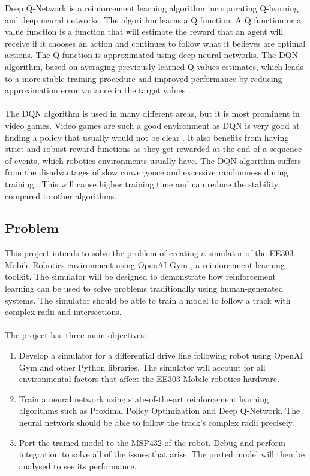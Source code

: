 \documentclass[a4paper,12pt]{article}
\begin{document}
Deep Q-Network is a reinforcement learning algorithm incorporating Q-learning and deep neural networks. The algorithm learns a Q function. A Q function or a value function is a function that will estimate the reward that an agent will receive if it chooses an action and continues to follow what it believes are optimal actions. The Q function is approximated using deep neural networks. The DQN algorithm, based on averaging previously learned Q-values estimates, which leads to a more stable training procedure and improved performance by reducing approximation error variance in the target values \cite{Anschel}.
\\\\
The DQN algorithm is used in many different areas, but it is most prominent in video games. Video games are such a good environment as DQN is very good at finding a policy that usually would not be clear \cite{mnih2013playing}. It also benefits from having strict and robust reward functions as they get rewarded at the end of a sequence of events, which robotics environments usually have. The DQN algorithm suffers from the disadvantages of slow convergence and excessive randomness during training \cite{YangMulti}. This will cause higher training time and can reduce the stability compared to other algorithms. 
\subsection{Problem}

This project intends to solve the problem of creating a simulator of the EE303 Mobile Robotics environment using OpenAI Gym \cite{brockman2016openai}, a reinforcement learning toolkit. The simulator will be designed to demonstrate how reinforcement learning can be used to solve problems traditionally using human-generated systems. The simulator should be able to train a model to follow a track with complex radii and intersections.
\\\\
The project has three main objectives:

\begin{enumerate}
  \item Develop a simulator for a differential drive line following robot using OpenAI Gym and other Python libraries. The simulator will account for all environmental factors that affect the EE303 Mobile robotics hardware. 

  \item Train a neural network using state-of-the-art reinforcement learning algorithms such as Proximal Policy Optimization and Deep Q-Network. The neural network should be able to follow the track's complex radii precisely.
  \item Port the trained model to the MSP432 of the robot. Debug and perform integration to solve all of the issues that arise. The ported model will then be analysed to see its performance.

\end{enumerate}
\end{document}
